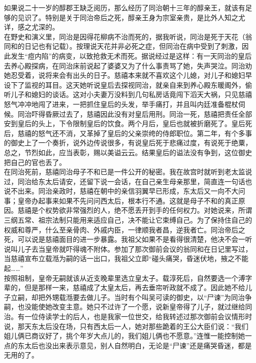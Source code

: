   如果说二十一岁的醇郡王缺乏阅历，那么经历了同治朝十三年的醇亲王，就该有足够的见识了。特别是关于同治帝后之死，醇亲王身为宗室亲贵，是比外人知之尤详，感之尤深的。\\

  在野史和演义里，同治是因得花柳病不治而死的，据我听说，同治是死于天花（翁同和的日记也有记载）。按理说天花并非必死之症，但同治在病中受到了刺激，因此发生“痘内陷”的病变，以致抢救无术而死。据说经过是这样：有一天同治的皇后去养心殿探病，在同治床前说起了婆婆又为了什么事责骂了她，失声哭泣。同治劝她忍受着，说将来会有出头的日子。慈禧本来就不喜欢这个儿媳，对儿子和媳妇早设下了监视的耳目。这天她听说皇后去探视同治，就亲自来到养心殿东暖阁外，偷听儿子和媳妇的谈话。这对小夫妻万没料到几句私房话竟闯下滔天大祸，只见慈禧怒气冲冲地闯了进来，一把抓住皇后的头发，举手痛打，并且叫内廷准备棍杖伺候。同治吓得昏厥过去了，慈禧因此没有对皇后用刑。同治一死，慈禧把责任全部安到皇后的头上，下令限制皇后的饮食。两个月后，皇后也就被折磨死了。皇后死后，慈禧的怒气还不消，又革掉了皇后的父亲崇绔的侍郎职位。第二年，有个多事的御史上了一个奏折，说外边传说很多，有说皇后死于悲痛过度，有说死于绝粟，总之，节烈如此，应当表彰，赐以美谥云云。结果皇后的谥法没有争到，这位御史把自己的官也丢了。\\

  在同治死前，慈禧同治母子不和已是一件公开的秘密。我在故宫时就听到老太监说过，同治给东太后请安，还留下说一会话，在自己亲生母亲那里，简直连一句话也说不出来。同治亲政时，慈禧在朝中的亲信羽翼早已形成，东太后又一向不大问事；皇帝办起事来如果不先问问西太后，根本行不通。这就是母子不和的真正原因。慈禧是个权势欲非常强烈的人，绝不愿丢开到手的任何权力。对她说来，所谓三纲五常、祖宗法制只能用来适应自己，决不能让它束缚自己。为了保持住自己的权威和尊严，什么至亲骨肉、外戚内臣，一律顺我者昌，逆我者亡。同治帝后之死，可以说是慈禧面目的进一步暴露。我祖父如果不是看得很清楚，他决不会一听说叫儿子去当皇帝就吓得魂不附体。参加了那次御前会议的翁同和在日记里写过，当慈禧宣布立载湉为嗣的话一出口，我祖父立即“碰头痛哭，昏迷伏地，掖之不能起……”\\

  按照祖制，皇帝无嗣就该从近支晚辈里选立皇太子。载淳死后，自然要选一个溥字辈的，但是那样一来，慈禧成了太皇太后，再去垂帘听政就不成了。因此她不给儿子立嗣，却把外甥载湉要去做儿子。当时有个叫吴可读的御史，以“尸谏”为同治争嗣，也没能使她改变主意。她只不过许了一个愿，说新皇帝得了儿子，就过继给同治。有一位侍读学士的后人，也是我家一位世交，给我转述过那次御前会议情形时说，那天东太后没在场，只有西太后一人，她对那些跪着的王公大臣们说：“我们姐儿俩已商议好了，挑个年岁大点儿的，我们姐儿俩也不愿意。”连惟一能控制她一点的东太后也没出来表示意见，别人自然明白，无论是“尸谏”还是痛哭昏迷，都是无用的了。\\


